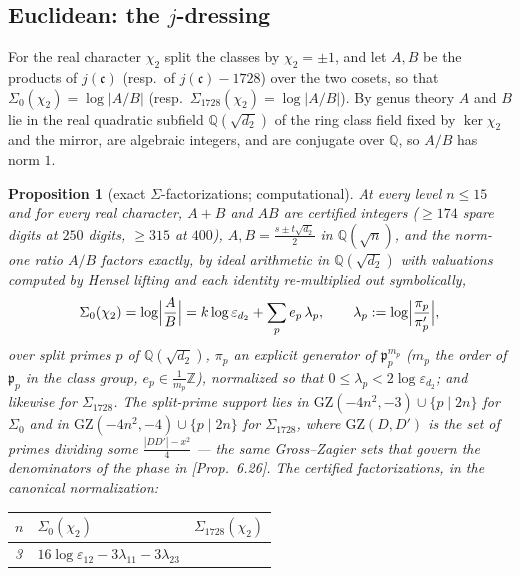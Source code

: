 \documentclass[11pt]{amsart}
\numberwithin{equation}{section}
\theoremstyle{plain}
\newtheorem{proposition}[theorem]{Proposition}
\theoremstyle{definition}
\theoremstyle{remark}
\newcommand{\Q}{\mathbb{Q}}
\newcommand{\Z}{\mathbb{Z}}
\newcommand{\idealc}{\mathfrak{c}}
\newcommand{\idealp}{\mathfrak{p}}
\newcommand{\GZ}{\mathrm{GZ}}
\newcommand{\eps}{\varepsilon}
\newcommand{\PaperI}{\cite{SchmidtI}}
\begin{document}
\subsection{Euclidean: the $j$-dressing}\label{subsec:dressing-euc}

For the real character $\chi_2$ split the classes by $\chi_2 = \pm1$, and
let $A, B$ be the products of $j(\idealc)$ (resp.\ of $j(\idealc) - 1728$)
over the two cosets, so that $\Sigma_0(\chi_2) = \log|A/B|$ (resp.\
$\Sigma_{1728}(\chi_2) = \log|A/B|$).  By genus theory $A$ and $B$ lie in
the real quadratic subfield $\Q(\sqrt{d_2})$ of the ring class field
fixed by $\ker\chi_2$ and the mirror, are algebraic integers, and are
conjugate over $\Q$, so $A/B$ has norm $1$.

\begin{proposition}[exact $\Sigma$-factorizations; computational]
\label{prop:dressing-euc}
At every level $n \le 15$ and for every real character, $A + B$ and $AB$
are certified integers ($\ge 174$ spare digits at $250$ digits, $\ge 315$
at $400$), $A, B = \tfrac{s \pm t\sqrt{d_2}}2$ in $\Q(\sqrt n)$, and the
norm-one ratio $A/B$ factors \emph{exactly}, by ideal arithmetic in
$\Q(\sqrt{d_2})$ with valuations computed by Hensel lifting and each
identity re-multiplied out symbolically,
\begin{equation}\label{eq:dressing}
  \Sigma_0(\chi_2) = \log\Bigl|\frac AB\Bigr|
  = k\log\eps_{d_2} + \sum_pe_p\,\lambda_p,
  \qquad
  \lambda_p := \log\Bigl|\frac{\pi_p}{\pi_p'}\Bigr|,
\end{equation}
over split primes $p$ of $\Q(\sqrt{d_2})$, $\pi_p$ an explicit generator
of $\idealp_p^{m_p}$ ($m_p$ the order of $\idealp_p$ in the class group,
$e_p \in \tfrac1{m_p}\Z$), normalized so that $0 \le \lambda_p <
2\log\eps_{d_2}$; and likewise for $\Sigma_{1728}$.  The split-prime
support lies in $\GZ(-4n^2,-3)\cup\{p \mid 2n\}$ for $\Sigma_0$ and in
$\GZ(-4n^2,-4)\cup\{p \mid 2n\}$ for $\Sigma_{1728}$, where $\GZ(D, D')$
is the set of primes dividing some $\tfrac{|DD'| - x^2}{4}$
\cite{GrossZagier1985} --- the same Gross--Zagier sets that govern the
denominators of the phase in \PaperI[Prop.~6.26].  The certified
factorizations, in the canonical normalization:
\begin{center}
\footnotesize
\setlength{\tabcolsep}{3pt}
\begin{tabular}{@{}lp{6.2cm}p{4.5cm}@{}}
\toprule
$n$ & $\Sigma_0(\chi_2)$ & $\Sigma_{1728}(\chi_2)$\\
\midrule
3 & $16\log\eps_{12} - 3\lambda_{11} - 3\lambda_{23}$ &

\end{tabular}
\end{center}
\end{proposition}
\end{document}

